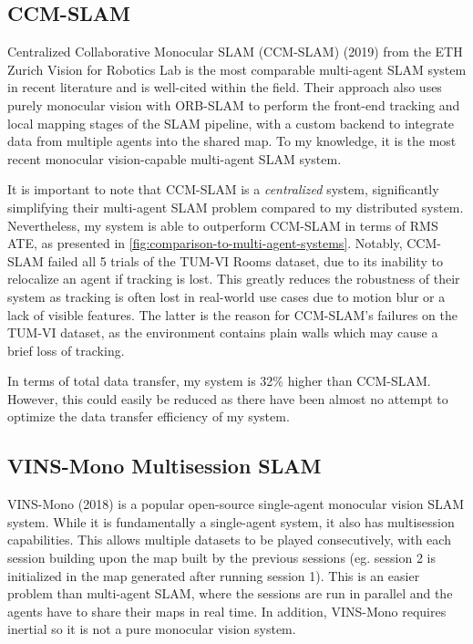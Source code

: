 \subsection{CCM-SLAM}
\label{sec:ccm-slam}
Centralized Collaborative Monocular SLAM (CCM-SLAM) (2019) from the ETH Zurich Vision for Robotics Lab \autocite{schmuck2019ccm} is the most comparable multi-agent SLAM system in recent literature and is well-cited within the field. Their approach also uses purely monocular vision with ORB-SLAM to perform the front-end tracking and local mapping stages of the SLAM pipeline, with a custom backend to integrate data from multiple agents into the shared map. To my knowledge, it is the most recent monocular vision-capable multi-agent SLAM system.

It is important to note that CCM-SLAM is a \textit{centralized} system, significantly simplifying their multi-agent SLAM problem compared to my distributed system. Nevertheless, my system is able to outperform CCM-SLAM in terms of RMS ATE, as presented in \autoref{fig:comparison-to-multi-agent-systems}. Notably, CCM-SLAM failed all 5 trials of the TUM-VI Rooms dataset, due to its inability to relocalize an agent if tracking is lost. This greatly reduces the robustness of their system as tracking is often lost in real-world use cases due to motion blur or a lack of visible features. The latter is the reason for CCM-SLAM's failures on the TUM-VI dataset, as the environment contains plain walls which may cause a brief loss of tracking.

In terms of total data transfer, my system is 32\% higher than CCM-SLAM. However, this could easily be reduced as there have been almost no attempt to optimize the data transfer efficiency of my system.

\subsection{VINS-Mono Multisession SLAM}
VINS-Mono (2018) \autocite{8421746} is a popular open-source single-agent monocular vision SLAM system. While it is fundamentally a single-agent system, it also has multisession capabilities. This allows multiple datasets to be played consecutively, with each session building upon the map built by the previous sessions (eg. session 2 is initialized in the map generated after running session 1). This is an easier problem than multi-agent SLAM, where the sessions are run in parallel and the agents have to share their maps in real time. In addition, VINS-Mono requires inertial so it is not a pure monocular vision system.


